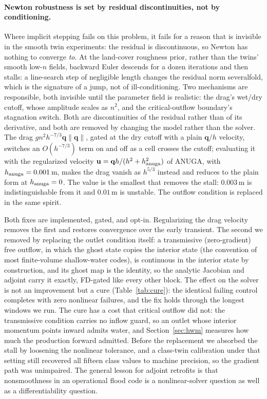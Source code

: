 \documentclass[11pt]{article}
\begin{document}
\paragraph{Newton robustness is set by residual discontinuities, not
by conditioning.}
Where implicit stepping fails on this problem, it fails for a reason
that is invisible in the smooth twin experiments: the residual is
discontinuous, so Newton has nothing to converge \emph{to}. At the
land-cover roughness prior, rather than the twins' smooth low-$n$
fields, backward Euler descends for a dozen iterations and then
stalls: a line-search step of negligible length changes the residual
norm severalfold, which is the signature of a jump, not of
ill-conditioning. Two mechanisms are responsible, both invisible until the parameter
field is realistic: the drag's wet/dry cutoff, whose amplitude scales
as $n^2$, and the critical-outflow boundary's stagnation switch. Both
are discontinuities of the residual rather than of its derivative, and
both are removed by changing the model rather than the solver. The
drag $g n^2 h^{-7/3}\mathbf{q}\lVert\mathbf{q}\rVert$, gated at the
dry cutoff with a plain $\mathbf{q}/h$ velocity, switches an
$O(h^{-7/3})$ term on and off as a cell crosses the cutoff; evaluating
it with the regularized velocity
$\mathbf{u} = \mathbf{q}h/(h^2 + h_{\rm anuga}^2)$ of
ANUGA, with $h_{\rm anuga} = 0.001$\,m, makes the drag vanish as
$h^{5/3}$ instead and reduces to the plain form at
$h_{\rm anuga} = 0$. The value is the smallest that removes the stall:
$0.003$\,m is indistinguishable from it and $0.01$\,m is unstable. The
outflow condition is replaced in the same spirit.

Both fixes are implemented, gated, and opt-in. Regularizing the drag
velocity removes the first and restores convergence over the early
transient. The second we removed by replacing the outlet condition
itself: a transmissive (zero-gradient) free outflow, in which the
ghost state copies the interior state (the convention of most
finite-volume shallow-water codes), is continuous in the interior
state by construction, and its ghost map is the identity, so the
analytic Jacobian and adjoint carry it exactly, FD-gated like every
other block. The effect on the solver is not an improvement but a cure
(Table~\ref{tab:cure}): the identical failing control completes with
zero nonlinear failures, and the fix holds through the longest windows
we run. The cure has a cost that critical outflow did not: the
transmissive condition carries no inflow guard, so an outlet whose
interior momentum points inward admits water, and
Section~\ref{sec:hwm} measures how much the production forward
admitted. Before the replacement we absorbed the stall by loosening the
nonlinear tolerance, and a class-twin calibration under that setting
still recovered all fifteen class values to machine precision, so the
gradient path was unimpaired. The general lesson for adjoint retrofits
is that nonsmoothness in an operational flood code is a
nonlinear-solver question as well as a differentiability question.
\end{document}
